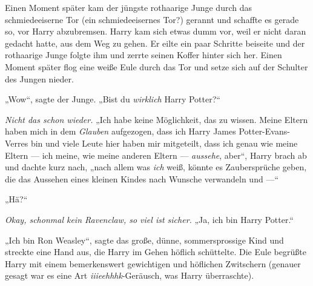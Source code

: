 Einen Moment später kam der jüngste rothaarige Junge durch das schmiedeeiserne Tor (ein schmiedeeisernes Tor?) gerannt und schaffte es gerade so, vor Harry abzubremsen. Harry kam sich etwas dumm vor, weil er nicht daran gedacht hatte, aus dem Weg zu gehen. Er eilte ein paar Schritte beiseite und der rothaarige Junge folgte ihm und zerrte seinen Koffer hinter sich her. Einen Moment später flog eine weiße Eule durch das Tor und setze sich auf der Schulter des Jungen nieder.

„Wow“, sagte der Junge.
„Bist du \emph{wirklich} Harry Potter?“

\emph{Nicht das schon wieder.}
„Ich habe keine Möglichkeit, das zu wissen. Meine Eltern haben mich in dem \emph{Glauben} aufgezogen, dass ich Harry James Potter-Evans-Verres bin und viele Leute hier haben mir mitgeteilt, dass ich genau wie meine Eltern — ich meine, wie meine anderen Eltern — \emph{aussehe}, aber“, Harry brach ab und dachte kurz nach, „nach allem was \emph{ich} weiß, könnte es Zaubersprüche geben, die das Aussehen eines kleinen Kindes nach Wunsche verwandeln und —“

„Hä?“

\emph{Okay, schonmal kein Ravenclaw, so viel ist sicher.}
„Ja, ich bin Harry Potter.“

„Ich bin Ron Weasley“, sagte das große, dünne, sommersprossige Kind und streckte eine Hand aus, die Harry im Gehen höflich schüttelte. Die Eule begrüßte Harry mit einem bemerkenswert gewichtigen und höflichen Zwitschern (genauer gesagt war es eine Art \emph{iiieehhhk}-Geräusch, was Harry überraschte).

